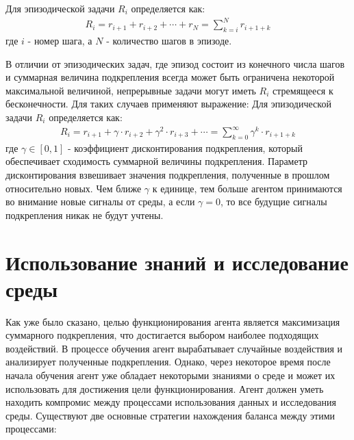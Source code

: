 Для эпизодической задачи $ R_i $ определяется как:
\begin{equation}
\label{eq:1_1p1}
\begin{alignedat}{2}
R_i=r_{i+1} + r_{i+2} + \cdots + r_N = \sum \limits_{k=i}^{N}r_{i+1+k} \end{alignedat}
\end{equation}
где $ i $ - номер шага, а $ N $ - количество шагов в эпизоде.

В отличии от эпизодических задач, где эпизод состоит из конечного числа шагов и суммарная величина подкрепления всегда может быть ограничена некоторой максимальной величиной, непрерывные задачи могут иметь $ R_i $ стремящееся к бесконечности. Для таких случаев применяют выражение:
Для эпизодической задачи $ R_i $ определяется как:
\begin{equation}
\label{eq:1_1p2}
\begin{alignedat}{2}
R_i=r_{i+1} + \gamma \cdot r_{i+2} + \gamma^2 \cdot r_{i+3} + \cdots = \sum \limits_{k=0}^{\infty}\gamma^k \cdot r_{i+1+k}
\end{alignedat}
\end{equation}
где $ \gamma \in [0, 1]$ - коэффициент дисконтирования подкрепления, который обеспечивает сходимость суммарной величины подкрепления.  
Параметр дисконтирования взвешивает значения подкрепления, полученные в прошлом относительно новых. Чем ближе $ \gamma $ к единице, тем больше агентом принимаются во внимание новые сигналы от среды, а если $ \gamma = 0 $, то все будущие сигналы подкрепления никак не будут учтены. 

\section{Использование знаний и исследование среды} \label{sect1_2}
Как уже было сказано, целью функционирования агента является максимизация суммарного подкрепления, что достигается выбором наиболее подходящих воздействий. В процессе обучения агент вырабатывает случайные воздействия и анализирует полученные подкрепления. Однако, через некоторое время после начала обучения агент уже обладает некоторыми знаниями о среде и может их использовать для достижения цели функционирования. Агент должен уметь находить компромис между процессами использования данных и исследования среды. Существуют две основные стратегии нахождения баланса между этими процессами:

